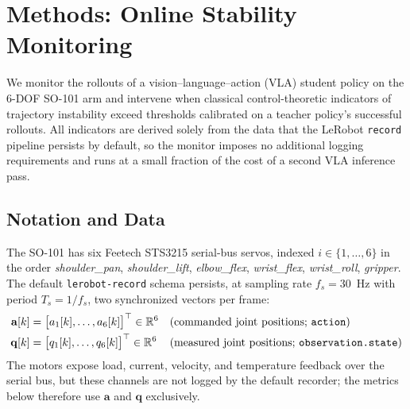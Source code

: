 %
%

\section{Methods: Online Stability Monitoring}

We monitor the rollouts of a vision--language--action (VLA) student policy on
the 6-DOF SO-101 arm and intervene when classical control-theoretic
indicators of trajectory instability exceed thresholds calibrated on a teacher
policy's successful rollouts. All indicators are derived solely from the data
that the LeRobot \texttt{record} pipeline persists by default, so the monitor
imposes no additional logging requirements and runs at a small fraction of the
cost of a second VLA inference pass.

\subsection{Notation and Data}

The SO-101 has six Feetech STS3215 serial-bus servos, indexed
$i \in \{1,\ldots,6\}$ in the order
\textit{shoulder\_pan}, \textit{shoulder\_lift}, \textit{elbow\_flex},
\textit{wrist\_flex}, \textit{wrist\_roll}, \textit{gripper}.
The default \texttt{lerobot-record} schema persists, at sampling rate
$f_s = 30$~Hz with period $T_s = 1/f_s$, two synchronized vectors per frame:
\begin{align}
    \mathbf{a}[k] &= \big[a_1[k], \ldots, a_6[k]\big]^\top \in \mathbb{R}^6 && \text{(commanded joint positions; \texttt{action})} \\
    \mathbf{q}[k] &= \big[q_1[k], \ldots, q_6[k]\big]^\top \in \mathbb{R}^6 && \text{(measured joint positions; \texttt{observation.state})}
\end{align}
The motors expose load, current, velocity, and temperature feedback over the
serial bus, but these channels are not logged by the default recorder; the
metrics below therefore use $\mathbf{a}$ and $\mathbf{q}$ exclusively.

